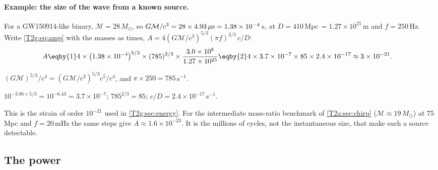 \paragraph{Example: the size of the wave from a known source.}
For a GW150914-like binary, $\mathcal M=28\,M_\odot$, so $G\mathcal M/c^3=28\times4.93\,\mu{\rm s}=1.38\times10^{-4}$\,s, at $D=410$\,Mpc$\,=1.27\times10^{25}$\,m and $f=250$\,Hz. Write \eqref{T2g:eq:amp} with the masses as times, $A=4(G\mathcal M/c^3)^{5/3}(\pi f)^{2/3}\,c/D$:
\begin{align*}
  A&\eqby{1}4\times\big(1.38\times10^{-4}\big)^{5/3}\times(785)^{2/3}\times\frac{3.0\times10^8}{1.27\times10^{25}}
  \eqby{2}4\times3.7\times10^{-7}\times85\times2.4\times10^{-17}
  \approx3\times10^{-21} .
\end{align*}
\begin{explain}
  \item $(G\mathcal M)^{5/3}/c^4=(G\mathcal M/c^3)^{5/3}c^5/c^4$, and $\pi\times250=785$\,s$^{-1}$.
  \item $10^{-3.86\times5/3}=10^{-6.43}=3.7\times10^{-7}$; $785^{2/3}=85$; $c/D=2.4\times10^{-17}$\,s$^{-1}$.
\end{explain}
This is the strain of order $10^{-21}$ used in \cref{T2g:sec:energy}. For the intermediate mass-ratio benchmark of \cref{T2a:sec:chirp} ($\mathcal M\approx19\,M_\odot$) at $75$\,Mpc and $f=20$\,mHz the same steps give $A\approx1.6\times10^{-23}$. It is the millions of cycles, not the instantaneous size, that make such a source detectable.

\subsection{The power}

